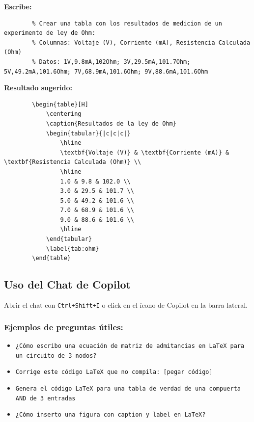 \documentclass[11pt,a4paper]{article}
\newcommand{\codigo}[1]{\texttt{\textcolor{codigo}{#1}}}
\newcommand{\comando}[1]{\textcolor{azulprofundo}{\texttt{#1}}}
\begin{document}
	\textbf{Escribe:}
	\begin{lstlisting}
		% Crear una tabla con los resultados de medicion de un experimento de ley de Ohm:
		% Columnas: Voltaje (V), Corriente (mA), Resistencia Calculada (Ohm)
		% Datos: 1V,9.8mA,102Ohm; 3V,29.5mA,101.7Ohm; 5V,49.2mA,101.6Ohm; 7V,68.9mA,101.6Ohm; 9V,88.6mA,101.6Ohm
	\end{lstlisting}
	
	\noindent \textbf{Resultado sugerido:}
	
	\begin{lstlisting}
		\begin{table}[H]
			\centering
			\caption{Resultados de la ley de Ohm}
			\begin{tabular}{|c|c|c|}
				\hline
				\textbf{Voltaje (V)} & \textbf{Corriente (mA)} & \textbf{Resistencia Calculada (Ohm)} \\
				\hline
				1.0 & 9.8 & 102.0 \\
				3.0 & 29.5 & 101.7 \\
				5.0 & 49.2 & 101.6 \\
				7.0 & 68.9 & 101.6 \\
				9.0 & 88.6 & 101.6 \\
				\hline
			\end{tabular}
			\label{tab:ohm}
		\end{table}
	\end{lstlisting}
	
	\subsection{Uso del Chat de Copilot}
	
	Abrir el chat con \comando{Ctrl+Shift+I} o click en el ícono de Copilot en la barra lateral.
	
	\subsubsection*{Ejemplos de preguntas útiles:}
	
	\begin{itemize}
		\item \codigo{¿Cómo escribo una ecuación de matriz de admitancias en LaTeX para un circuito de 3 nodos?}
		\item \codigo{Corrige este código LaTeX que no compila: [pegar código]}
		\item \codigo{Genera el código LaTeX para una tabla de verdad de una compuerta AND de 3 entradas}
		\item \codigo{¿Cómo inserto una figura con caption y label en LaTeX?}
	\end{itemize}
	
\end{document}
